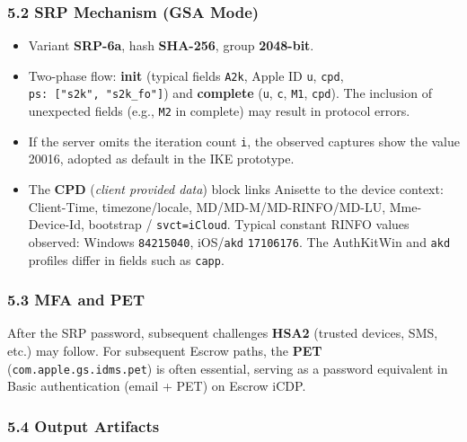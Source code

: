 \documentclass[
  english,
  10pt]{article}
\providecommand{\tightlist}{%
  \setlength{\itemsep}{0pt}\setlength{\parskip}{0pt}}
\begin{document}
\subsubsection{5.2 SRP Mechanism (GSA
Mode)}\label{srp-mechanism-gsa-mode}

\begin{itemize}
\tightlist
\item
  Variant \textbf{SRP-6a}, hash \textbf{SHA-256}, group
  \textbf{2048-bit}.
\item
  Two-phase flow: \textbf{init} (typical fields \texttt{A2k}, Apple ID
  \texttt{u}, \texttt{cpd}, \texttt{ps:\ {[}"s2k",\ "s2k\_fo"{]}}) and
  \textbf{complete} (\texttt{u}, \texttt{c}, \texttt{M1}, \texttt{cpd}).
  The inclusion of unexpected fields (e.g., \texttt{M2} in complete) may
  result in protocol errors.
\item
  If the server omits the iteration count \texttt{i}, the observed
  captures show the value 20016, adopted as default in the IKE
  prototype.
\item
  The \textbf{CPD} (\emph{client provided data}) block links Anisette to
  the device context: Client-Time, timezone/locale,
  MD/MD-M/MD-RINFO/MD-LU, Mme-Device-Id, bootstrap /
  \texttt{svct=iCloud}. Typical constant RINFO values observed: Windows
  \texttt{84215040}, iOS/\texttt{akd} \texttt{17106176}. The AuthKitWin
  and \texttt{akd} profiles differ in fields such as \texttt{capp}.
\end{itemize}

\subsubsection{5.3 MFA and PET}\label{mfa-and-pet}

After the SRP password, subsequent challenges \textbf{HSA2} (trusted
devices, SMS, etc.) may follow. For subsequent Escrow paths, the
\textbf{PET} (\texttt{com.apple.gs.idms.pet}) is often essential,
serving as a password equivalent in Basic authentication (email + PET)
on Escrow iCDP.

\subsubsection{5.4 Output Artifacts}\label{output-artifacts}
\end{document}
